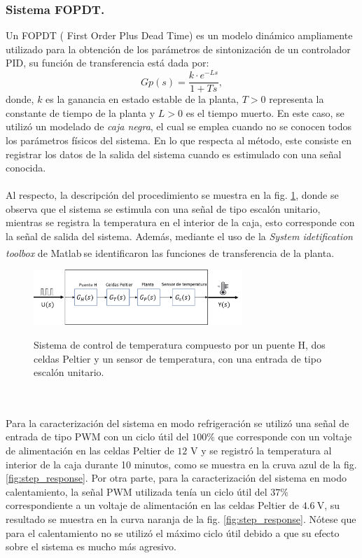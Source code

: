 \subsubsection{Sistema FOPDT.}
Un FOPDT ( First Order Plus Dead Time) es un modelo dinámico ampliamente utilizado para la obtención de los parámetros de sintonización de un controlador PID, su función de transferencia está dada por:
\begin{equation}
Gp(s)=  \frac{k\cdot e^{-Ls}}{1+Ts},
\label{FOPDT_model}
\end{equation}
donde, $k$ es la ganancia en estado estable de la planta, $T > 0$  representa la constante de tiempo de la planta y $L > 0$ es el tiempo muerto. En este caso, se utilizó un modelado de \textit{caja negra}, el cual se emplea cuando no se conocen todos los parámetros físicos del sistema. En lo que respecta al método, este consiste en registrar los datos de la salida del sistema cuando es estimulado  con una señal conocida.\\ \\
Al respecto, la descripción del procedimiento se muestra en la fig. \ref{fig:Modelo_caja_negra}, donde se observa que el sistema se estimula con una señal de tipo escalón unitario, mientras se registra la temperatura en el interior de la caja, esto corresponde con la señal de salida del sistema. Además, mediante el uso de la \textit{System idetification toolbox} de Matlab\textsuperscript \textregistered $~$se identificaron las funciones de transferencia de la planta.
\begin{figure}[h!]
\begin{centering}
    \caption{Sistema de control de temperatura compuesto por un puente H, dos celdas Peltier y un sensor de temperatura, con una entrada de tipo escalón unitario.}
    \includegraphics[width=0.7\textwidth]{Images/Modelo_caja_negra.png}
    \label{fig:Modelo_caja_negra}
  \par\end{centering}
\end{figure}
\\ \\
Para la caracterización del sistema en modo refrigeración se utilizó una señal de entrada de tipo PWM con un ciclo útil del $100\%$ que corresponde con un voltaje de alimentación en las celdas Peltier de $12$ V y se registró la temperatura al interior de la caja durante 10 minutos, como se muestra en la cruva azul de la fig. \ref{fig:step_response}. Por otra parte, para la caracterización del sistema en modo calentamiento, la señal PWM utilizada tenía un ciclo útil del  $37\%$ correspondiente a un voltaje de alimentación en las celdas Peltier de $4.6~\mbox{V}$, su resultado se muestra en la curva naranja de la fig. \ref{fig:step_response}. Nótese que para el calentamiento no se utilizó el máximo ciclo útil debido a  que su efecto sobre el sistema es mucho más agresivo.
